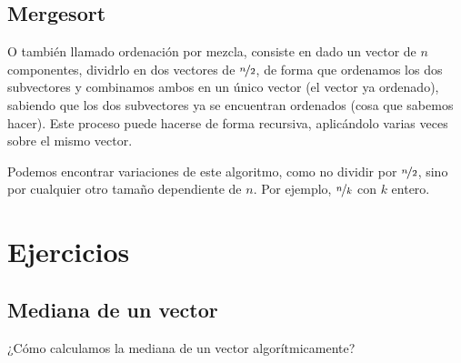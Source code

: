 
\subsection{Mergesort}
O también llamado ordenación por mezcla, consiste en dado un vector de $n$ componentes, dividrlo en dos vectores de $\nicefrac{n}{2}$, de forma que ordenamos los dos subvectores y combinamos ambos en un único vector (el vector ya ordenado), sabiendo que los dos subvectores ya se encuentran ordenados (cosa que sabemos hacer). Este proceso puede hacerse de forma recursiva, aplicándolo varias veces sobre el mismo vector.

Podemos encontrar variaciones de este algoritmo, como no dividir por $\nicefrac{n}{2}$, sino por cualquier otro tamaño dependiente de $n$. Por ejemplo, $\nicefrac{n}{k}$ con $k$ entero.

\section{Ejercicios}
\subsection{Mediana de un vector}
\begin{ejercicio*}
    ¿Cómo calculamos la mediana de un vector algorítmicamente?

\end{ejercicio*}
